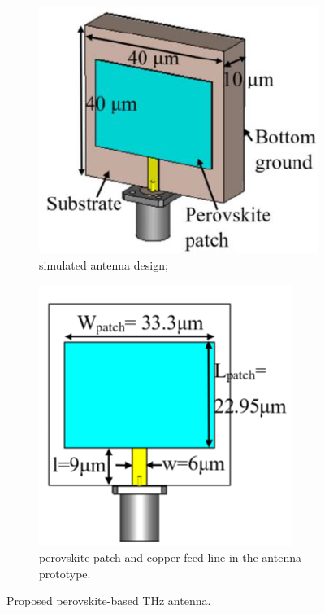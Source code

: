 \documentclass[12pt]{suhbook}
\begin{document}
\begin{figure}[hbt!]
\begin{subfigure}{.5\textwidth}
\centering
\includegraphics[width=.9\linewidth]{15}
\caption{simulated antenna design;}
\label{fig:sfig11a}
\end{subfigure}%
\begin{subfigure}{.4\textwidth}
  \centering
  \includegraphics[width=.9\linewidth]{16}
  \caption{perovskite patch and copper feed line in the antenna prototype.}
  \label{fig:sfigb11}
\end{subfigure}
\caption{Proposed perovskite-based THz antenna.}
\label{fig:fig 11b}
\end{figure}
\end{document}
